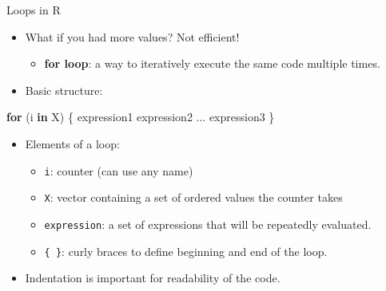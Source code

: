 \documentclass[
  ignorenonframetext,
]{beamer}
\newenvironment{Shaded}{\begin{snugshade}}{\end{snugshade}}
\newcommand{\ControlFlowTok}[1]{\textcolor[rgb]{0.13,0.29,0.53}{\textbf{#1}}}
\newcommand{\NormalTok}[1]{#1}
\providecommand{\tightlist}{%
  \setlength{\itemsep}{0pt}\setlength{\parskip}{0pt}}
\begin{document}
\begin{frame}[fragile]{Loops in R}
\label{loops-in-r}
\pause

\begin{itemize}
\tightlist
\item
  What if you had more values? Not efficient! \pause

  \begin{itemize}
  \tightlist
  \item
    \textbf{for loop}: a way to iteratively execute the same code
    multiple times. \pause
  \end{itemize}
\item
  Basic structure: \pause
\end{itemize}

\small

\begin{Shaded}
\begin{Highlighting}[]
\ControlFlowTok{for}\NormalTok{ (i }\ControlFlowTok{in}\NormalTok{ X) \{}
\NormalTok{  expression1}
\NormalTok{  expression2}
\NormalTok{  ...}
\NormalTok{  expression3}
\NormalTok{\}}
\end{Highlighting}
\end{Shaded}

\pause

\begin{itemize}
\tightlist
\item
  Elements of a loop: \pause

  \begin{itemize}
  \tightlist
  \item
    \texttt{i}: counter (can use any name) \pause
  \item
    \texttt{X}: vector containing a set of ordered values the counter
    takes \pause
  \item
    \texttt{expression}: a set of expressions that will be repeatedly
    evaluated. \pause
  \item
    \texttt{\{\ \}}: curly braces to define beginning and end of the
    loop. \pause
  \end{itemize}
\item
  Indentation is important for readability of the code.
\end{itemize}
\end{frame}
\end{document}
